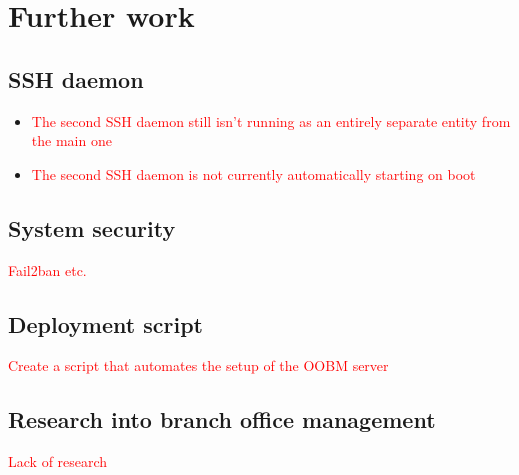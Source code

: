 
\section{Further work}
\label{section:conclusion-furtherwork}
\subsection{SSH daemon}
\label{subsection:conclusion-furtherwork-sshdaemon}
\begin{itemize}
    \item \textcolor{red}{The second SSH daemon still isn't running as an entirely separate entity from the main one}
    \item \textcolor{red}{The second SSH daemon is not currently automatically starting on boot}
\end{itemize}

\subsection{System security}
\label{subsection:conclusion-furtherwork-security}
\textcolor{red}{Fail2ban etc.}

\subsection{Deployment script}
\label{subsection:conclusion-furtherwork-script}
\textcolor{red}{Create a script that automates the setup of the OOBM server}

\subsection{Research into branch office management}
\label{subsection:conclusion-furtherwork-branchoffice}
\textcolor{red}{Lack of research}